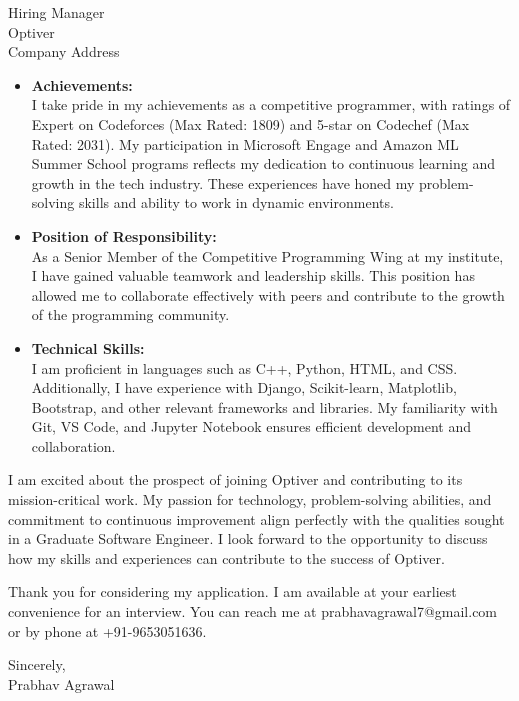 \documentclass[a4paper,10pt]{letter}
\begin{document}
\begin{letter}{Hiring Manager \\ Optiver \\ Company Address}
\begin{itemize}[leftmargin=*]
\item \textbf{Achievements:} \\
I take pride in my achievements as a competitive programmer, with ratings of Expert on Codeforces (Max Rated: 1809) and 5-star on Codechef (Max Rated: 2031). My participation in Microsoft Engage and Amazon ML Summer School programs reflects my dedication to continuous learning and growth in the tech industry. These experiences have honed my problem-solving skills and ability to work in dynamic environments.

\item \textbf{Position of Responsibility:} \\
As a Senior Member of the Competitive Programming Wing at my institute, I have gained valuable teamwork and leadership skills. This position has allowed me to collaborate effectively with peers and contribute to the growth of the programming community.

\item \textbf{Technical Skills:} \\
I am proficient in languages such as C++, Python, HTML, and CSS. Additionally, I have experience with Django, Scikit-learn, Matplotlib, Bootstrap, and other relevant frameworks and libraries. My familiarity with Git, VS Code, and Jupyter Notebook ensures efficient development and collaboration.
\end{itemize}

I am excited about the prospect of joining Optiver and contributing to its mission-critical work. My passion for technology, problem-solving abilities, and commitment to continuous improvement align perfectly with the qualities sought in a Graduate Software Engineer. I look forward to the opportunity to discuss how my skills and experiences can contribute to the success of Optiver.

Thank you for considering my application. I am available at your earliest convenience for an interview. You can reach me at prabhavagrawal7@gmail.com or by phone at +91-9653051636.

\closing{Sincerely, \\
Prabhav Agrawal}
\end{letter}
\end{document}
